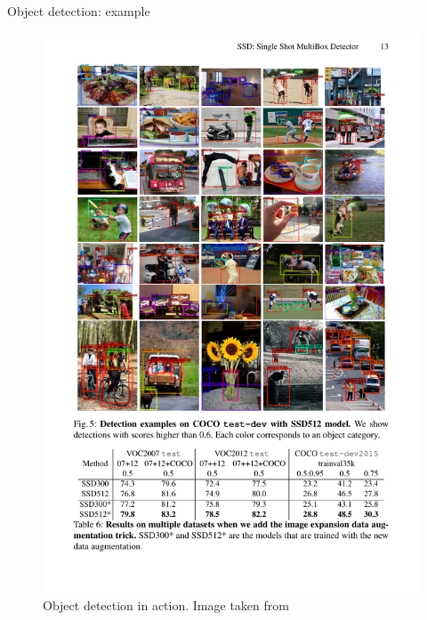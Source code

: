 \documentclass[xcolor=pdftex,dvipsnames,table]{beamer}
\begin{document}
\begin{frame}{Object detection: example}
\begin{figure}[htb]
   \centering
   \includegraphics[width=\textwidth]{../graphics/Detection_example3.pdf}
   \caption{Object detection in action. Image taken from \cite{Liu2016}}
\end{figure}
\end{frame}

\end{document}

